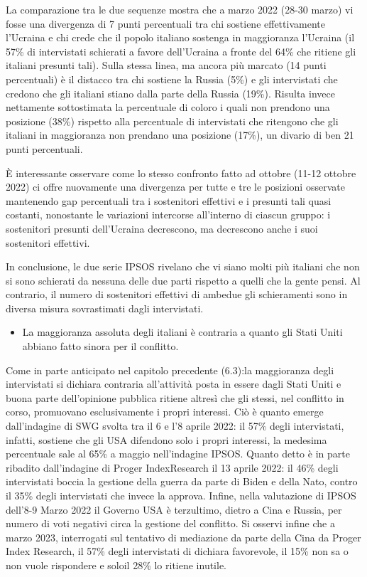 \documentclass[
]{book}
\providecommand{\tightlist}{%
  \setlength{\itemsep}{0pt}\setlength{\parskip}{0pt}}
\begin{document}
La comparazione tra le due sequenze mostra che a marzo 2022 (28-30 marzo) vi fosse una divergenza di 7 punti percentuali tra chi sostiene effettivamente l'Ucraina e chi crede che il popolo italiano sostenga in maggioranza l'Ucraina (il 57\% di intervistati schierati a favore dell'Ucraina a fronte del 64\% che ritiene gli italiani presunti tali). Sulla stessa linea, ma ancora più marcato (14 punti percentuali) è il distacco tra chi sostiene la Russia (5\%) e gli intervistati che credono che gli italiani stiano dalla parte della Russia (19\%). Risulta invece nettamente sottostimata la percentuale di coloro i quali non prendono una posizione (38\%) rispetto alla percentuale di intervistati che ritengono che gli italiani in maggioranza non prendano una posizione (17\%), un divario di ben 21 punti percentuali.

È interessante osservare come lo stesso confronto fatto ad ottobre (11-12 ottobre 2022) ci offre nuovamente una divergenza per tutte e tre le posizioni osservate mantenendo gap percentuali tra i sostenitori effettivi e i presunti tali quasi costanti, nonostante le variazioni intercorse all'interno di ciascun gruppo: i sostenitori presunti dell'Ucraina decrescono, ma decrescono anche i suoi sostenitori effettivi.

In conclusione, le due serie IPSOS rivelano che vi siano molti più italiani che non si sono schierati da nessuna delle due parti rispetto a quelli che la gente pensi. Al contrario, il numero di sostenitori effettivi di ambedue gli schieramenti sono in diversa misura sovrastimati dagli intervistati.

\begin{itemize}
\tightlist
\item
  La maggioranza assoluta degli italiani è contraria a quanto gli Stati Uniti abbiano fatto sinora per il conflitto.
\end{itemize}

Come in parte anticipato nel capitolo precedente (6.3):la maggioranza degli intervistati si dichiara contraria all'attività posta in essere dagli Stati Uniti e buona parte dell'opinione pubblica ritiene altresì che gli stessi, nel conflitto in corso, promuovano esclusivamente i propri interessi. Ciò è quanto emerge dall'indagine di SWG svolta tra il 6 e l'8 aprile 2022: il 57\% degli intervistati, infatti, sostiene che gli USA difendono solo i propri interessi, la medesima percentuale sale al 65\% a maggio nell'indagine IPSOS. Quanto detto è in parte ribadito dall'indagine di Proger IndexResearch il 13 aprile 2022: il 46\% degli intervistati boccia la gestione della guerra da parte di Biden e della Nato, contro il 35\% degli intervistati che invece la approva. Infine, nella valutazione di IPSOS dell'8-9 Marzo 2022 il Governo USA è terzultimo, dietro a Cina e Russia, per numero di voti negativi circa la gestione del conflitto. Si osservi infine che a marzo 2023, interrogati sul tentativo di mediazione da parte della Cina da Proger Index Research, il 57\% degli intervistati di dichiara favorevole, il 15\% non sa o non vuole rispondere e soloil 28\% lo ritiene inutile.
\end{document}
